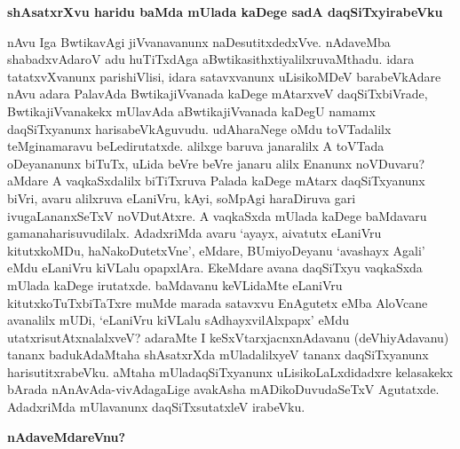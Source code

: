 {\bigskip
\noindent
{\large\bf shAsatxrXvu haridu baMda mUlada kaDege sadA daqSiTxyirabeVku}}\label{page142}
\medskip

\noindent
nAvu Iga BwtikavAgi jiVvanavanunx naDesutitxdedxVve. nAdaveMba shabadxvAdaroV adu huTiTxdAga aBwtikasithxtiyalilxruvaMthadu. idara tatatxvXvanunx parishiVlisi, idara satavxvanunx uLisikoMDeV barabeVkAdare nAvu adara PalavAda BwtikajiVvanada kaDege mAtarxveV daqSiTxbiVrade, BwtikajiVvanakekx mUlavAda aBwtika\-jiVvanada kaDegU namamx daqSiTxyanunx harisabeVkAguvudu. udAharaNege oMdu toVTadalilx teMgina\-maravu beLedirutatxde. alilxge baruva janaralilx A toVTada oDeyananunx biTuTx, uLida beVre beVre janaru alilx Enanunx noVDuvaru? aMdare A vaqkaSxdalilx biTiTxruva Palada kaDege mAtarx daqSiTxyanunx biVri, avaru alilxruva eLaniVru, kAyi, soMpAgi haraDiruva gari ivugaLananxSeTxV noVDutAtxre. A vaqkaSxda mU\-lada kaDege baMdavaru gamanaharisuvudilalx. AdadxriMda avaru `ayayx, aivatutx eLaniVru kitutx\-koMDu, haNakoDutetxVne', eMdare, BUmiyoDeyanu `avashayx Agali' eMdu eLaniVru kiVLalu opapxlAra. EkeM\-dare avana daqSiTxyu vaqkaSxda mUlada kaDege irutatxde. baMdavanu keVLidaMte eLaniVru kitutxkoTuTx\-biTaTxre muMde marada satavxvu EnAgutetx eMba AloVcane avanalilx mUDi, `eLaniVru kiVLalu sAdhayxvi\-lAlxpapx' eMdu utatxrisutAtxnalalxveV? adaraMte I keSxVtarxjacnxnAdavanu (deVhiyAdavanu) tananx badukAdaMtaha shA\-satxrXda mUladalilxyeV tananx daqSiTxyanunx harisutitxrabeVku. aMtaha mUladaqSiTxyanunx uLisikoLaLxdidadxre kelasakekx bArada nAnAvAda-vivAdagaLige avakAsha mADikoDuvudaSeTxV Agutatxde. AdadxriMda mUla\-vanunx daqSiTxsutatxleV irabeVku.

{\bigskip
\noindent
{\large\bf nAdaveMdareVnu?}}\label{page142}
\medskip

